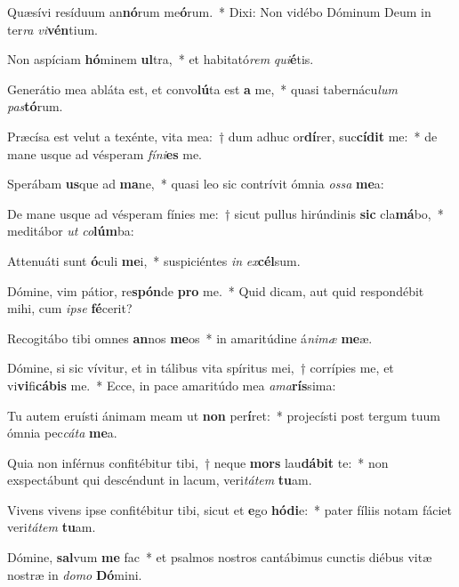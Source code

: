 \item Quæsívi resíduum an\textbf{nó}rum me\textbf{ó}rum.~* Dixi: Non vidébo Dóminum Deum in ter\textit{ra} \textit{vi}\textbf{vén}tium.
\item Non aspíciam \textbf{hó}minem \textbf{ul}tra,~* et habitató\textit{rem} \textit{qui}\textbf{é}tis.
\item Generátio mea abláta est, et convo\textbf{lú}ta est \textbf{a} me,~* quasi tabernácu\textit{lum} \textit{pas}\textbf{tó}rum.
\item Præcísa est velut a texénte, vita mea:~† dum adhuc or\textbf{dí}rer, suc\textbf{cí}\textbf{dit} me:~* de mane usque ad vésperam \textit{fí}\textit{ni}\textbf{es} me.
\item Sperábam \textbf{us}que ad \textbf{ma}ne,~* quasi leo sic contrívit ómnia \textit{os}\textit{sa} \textbf{me}a:
\item De mane usque ad vésperam fínies me:~† sicut pullus hirúndinis \textbf{sic} cla\textbf{má}bo,~* meditábor \textit{ut} \textit{co}\textbf{lúm}ba:
\item Attenuáti sunt \textbf{ó}culi \textbf{me}i,~* suspiciéntes \textit{in} \textit{ex}\textbf{cél}sum.
\item Dómine, vim pátior, re\textbf{spón}de \textbf{pro} me.~* Quid dicam, aut quid respondébit mihi, cum \textit{ip}\textit{se} \textbf{fé}cerit?
\item Recogitábo tibi omnes \textbf{an}nos \textbf{me}os~* in amaritúdine á\textit{ni}\textit{mæ} \textbf{me}æ.
\item Dómine, si sic vívitur, et in tálibus vita spíritus mei,~† corrípies me, et vi\textbf{vi}fi\textbf{cá}\textbf{bis} me.~* Ecce, in pace amaritúdo mea \textit{a}\textit{ma}\textbf{rís}sima:
\item Tu autem eruísti ánimam meam ut \textbf{non} per\textbf{í}ret:~* projecísti post tergum tuum ómnia pec\textit{cá}\textit{ta} \textbf{me}a.
\item Quia non inférnus confitébitur tibi,~† neque \textbf{mors} lau\textbf{dá}\textbf{bit} te:~* non exspectábunt qui descéndunt in lacum, veri\textit{tá}\textit{tem} \textbf{tu}am.
\item Vivens vivens ipse confitébitur tibi, sicut et \textbf{e}go \textbf{hó}\textbf{di}e:~* pater fíliis notam fáciet veri\textit{tá}\textit{tem} \textbf{tu}am.
\item Dómine, \textbf{sal}vum \textbf{me} fac~* et psalmos nostros cantábimus cunctis diébus vitæ nostræ in \textit{do}\textit{mo} \textbf{Dó}mini.
